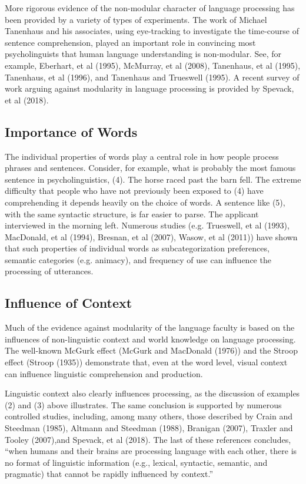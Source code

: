 \documentclass[a4paper]{article}
\begin{document}
More rigorous evidence of the non-modular character of language processing has been provided by a variety of types of experiments.  The work of Michael Tanenhaus and his associates, using eye-tracking to investigate the time-course of sentence comprehension, played an important role in convincing most psycholinguists that human language understanding is non-modular.  See, for example, Eberhart, et al (1995), McMurray, et al (2008), Tanenhaus, et al (1995), Tanenhaus, et al (1996), and Tanenhaus and Trueswell (1995). A recent survey of work arguing against modularity in language processing is provided by Spevack, et al (2018).  

\subsection{Importance of Words}

The individual properties of words play a central role in how people process phrases and sentences.  Consider, for example, what is probably the most famous sentence in psycholinguistics, (4).
\ea
The horse raced past the barn fell.
\z
The extreme difficulty that people who have not previously been exposed to (4) have comprehending it depends heavily on the choice of words.  A sentence like (5), with the same syntactic structure, is far easier to parse.
\ea
The applicant interviewed in the morning left.
\z
Numerous studies (e.g. Trueswell, et al (1993), MacDonald, et al (1994), Bresnan, et al (2007), Wasow, et al (2011))  have shown that such properties of individual words as subcategorization preferences, semantic categories (e.g. animacy), and frequency of use can influence the processing of utterances.  

\subsection{Influence of Context}

Much of the evidence against modularity of the language faculty is based on the influences of non-linguistic context and world knowledge on language processing.  The well-known McGurk effect (McGurk and MacDonald (1976)) and the Stroop effect (Stroop (1935)) demonstrate that, even at the word level, visual context can influence linguistic comprehension and production.

Linguistic context also clearly influences processing, as the discussion of examples (2) and (3) above illustrates.  The same conclusion is supported by numerous controlled studies, including, among many others, those described by Crain and Steedman (1985), Altmann and Steedman (1988), Branigan (2007), Traxler and Tooley (2007),and Spevack, et al (2018).  The last of these references concludes, ``when humans and their brains are processing language with each other, there is no format
of linguistic information (e.g., lexical, syntactic, semantic, and pragmatic) that cannot be rapidly
influenced by context.''
\end{document}
